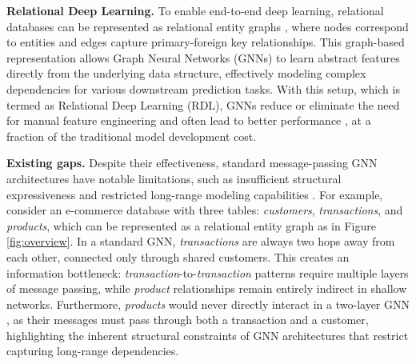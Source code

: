 \documentclass{article} %
\begin{document}
\textbf{Relational Deep Learning.} To enable end-to-end deep learning, relational databases can be represented as relational entity graphs \citep{fey2023relational}, where nodes correspond to entities and edges capture primary-foreign key relationships. This graph-based representation allows 
Graph Neural Networks (GNNs) 
to learn abstract features directly from the underlying data structure, effectively modeling complex dependencies for various downstream prediction tasks. With this setup, which is termed as Relational Deep Learning (RDL), GNNs reduce or eliminate the need for manual feature engineering and often lead to better performance \citep{robinson2025relbench}, at a fraction of the traditional model development cost.

\textbf{Existing gaps.} Despite their effectiveness, standard message-passing GNN architectures \citep{gilmer2017neural, kipf2016semi, hamilton2017inductive, velickovic2017graph} have notable limitations, such as insufficient structural expressiveness \citep{xu2018powerful, morris2019weisfeiler, loukas2019graph} and restricted long-range modeling capabilities \citep{alon2020bottleneck}. 
For example, consider an e-commerce database with three tables: \textit{customers}, \textit{transactions}, and \textit{products}, which can be represented as a relational entity graph as in Figure \ref{fig:overview}. 
In a standard GNN, \textit{transactions} are always two hops away from each other, connected only through shared customers. This creates an information bottleneck: \textit{transaction}-to-\textit{transaction} patterns require multiple layers of message passing, while \textit{product} relationships remain entirely indirect in shallow networks. Furthermore, \textit{products} would never directly interact in a two-layer GNN \citep{robinson2025relbench}, as their messages must pass through both a transaction and a customer, highlighting the inherent structural constraints of GNN architectures that restrict capturing long-range dependencies.
\end{document}
